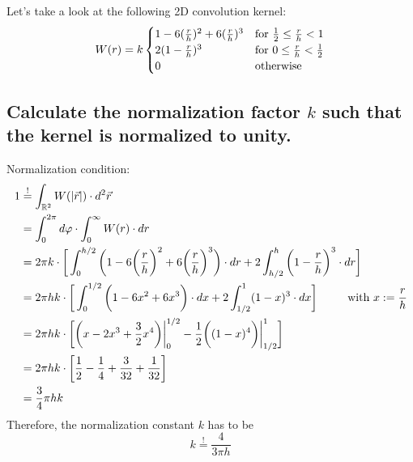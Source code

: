 Let's take a look at the following 2D convolution kernel:
\begin{equation}
    W(r)=k\begin{cases}
        1-6(\frac{r}{h})^2+6(\frac{r}{h})^3 
        & \textnormal{for }\frac{1}{2}\leq\frac{r}{h}<1 \\
        2(1-\frac{r}{h})^3
        & \textnormal{for }0\leq\frac{r}{h}<\frac{1}{2} \\
        0 
        & \textnormal{otherwise} \\
    \end{cases}
\end{equation}

\subsection{Calculate the normalization factor $k$ such that the 
kernel is normalized to unity.}
    Normalization condition:
    \begin{align}
        1
        &\overset{!}{=}\int_{\mathbb{R}^2}W(|\vec r|)\cdot d^2\vec r \\
        &=\int_0^{2\pi}d\varphi\cdot\int_0^\infty W(r)\cdot dr \\
        &=2\pi k\cdot\bigg[
            \int_0^{h/2}\bigg(
                1-6\bigg(\frac{r}{h}\bigg)^2+
                6\bigg(\frac{r}{h}\bigg)^3
            \bigg)\cdot dr+2\int_{h/2}^h\bigg(1-\frac{r}{h}\bigg)^3\cdot dr
        \bigg] \\
        &=2\pi hk\cdot\bigg[
            \int_0^{1/2}\bigg(
                1-6x^2+
                6x^3
            \bigg)\cdot dx+2\int_{1/2}^1(1-x)^3\cdot dx
        \bigg] \ \ \ \ \ \ \ \ \textnormal{with $x:=\frac{r}{h}$} \\
        &=2\pi hk\cdot\bigg[
            \bigg(
                x-2x^3+\frac{3}{2}x^4
            \bigg)\bigg|_0^{1/2}-\frac{1}{2}\bigg(
                (1-x)^4
            \bigg)\bigg|_{1/2}^{1}
        \bigg] \\
        &=2\pi hk\cdot\bigg[
            \frac{1}{2}-\frac{1}{4}+\frac{3}{32}+\frac{1}{32}    
        \bigg] \\
        &=\frac{3}{4}\pi hk
    \end{align}
    Therefore, the normalization constant $k$ has to be
    \begin{equation}
        k\overset{!}{=}\frac{4}{3\pi h}
    \end{equation}

